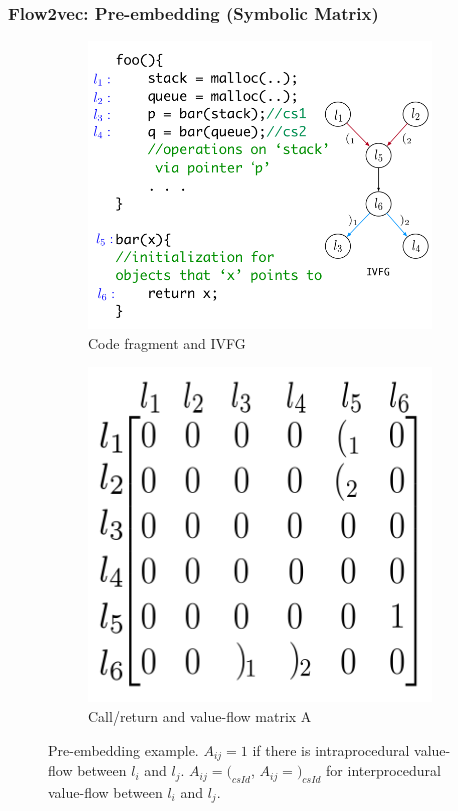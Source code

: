 \documentclass[xcolor=table,english]{beamer}
\begin{document}
\begin{frame}[fragile] \frametitle{Flow2vec: Pre-embedding (Symbolic Matrix)}
    \begin{figure}
        \centering
        \begin{subfigure}[b]{0.45\textwidth}
            \includegraphics[width=\textwidth]{figures/pre_embeding_a.png}
            \caption{Code fragment and IVFG}
        \end{subfigure}
        \hfill
        \begin{subfigure}[b]{0.45\textwidth}
            \includegraphics[width=\textwidth]{figures/pre_embedding_b.png}
            \caption{Call/return and value-flow matrix A}
        \end{subfigure}
        \caption{Pre-embedding example. $A_{ij} = 1$ if there is intraprocedural value-flow between $l_i$ and $l_j$. $A_{ij} = (_{csId}$, $A_{ij} = )_{csId}$ for interprocedural value-flow between $l_i$ and $l_j$.}
    \end{figure}
\end{frame}
\end{document}
